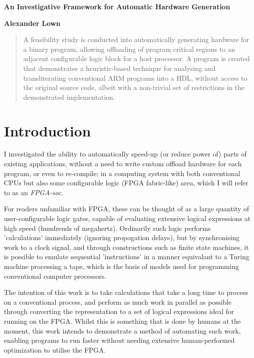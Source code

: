 \documentclass[a4paper]{article}
\begin{document}
\lstset{basicstyle=\ttfamily\footnotesize, breaklines=true}
\centerline{\Large \bf An Investigative Framework for Automatic Hardware Generation}
\medskip
\centerline{\bf Alexander Lown}
\bigskip

\begin{abstract}
  A feasibility study is conducted into automatically generating hardware for a binary program, allowing offloading of program critical regions to an adjacent configurable logic block for a host processor.
  A program is created that demonstrates a heuristic-based technique for analysing and transliterating conventional ARM programs into a HDL, without access to the original source code, albeit with a non-trivial set of restrictions in the demonstrated implementation.
\end{abstract}

\section{Introduction}
I investigated the ability to automatically speed-up (or reduce power of) parts of existing applications, without a need to write custom offload hardware for each program, or even to re-compile; in a computing system with both conventional CPUs but also some configurable logic (FPGA fabric-like) area, which I will refer to as an \emph{FPGA-soc}.

For readers unfamiliar with FPGA, these can be thought of as a large quantity of user-configurable logic gates, capable of evaluating extensive logical expressions at high speed (hundrends of megahertz). Ordinarily such logic performs 'calculations' immediately (ignoring propogation delays), but by synchronising work to a clock signal, and through constructions such as finite state machines, it is possible to emulate sequential 'instructions' in a manner equivalant to a Turing machine processing a tape, which is the basis of models used for programming conventional computer processors.

The intention of this work is to take calculations that take a long time to process on a conventional process, and perform as much work in parallel as possible through converting the representation to a set of logical expressions ideal for running on the FPGA. Whilst this is something that is done by humans at the moment, this work intends to demonstrate a method of automating such work, enabling programs to run faster without needing extensive human-performed optimization to utilise the FPGA.
\end{document}
